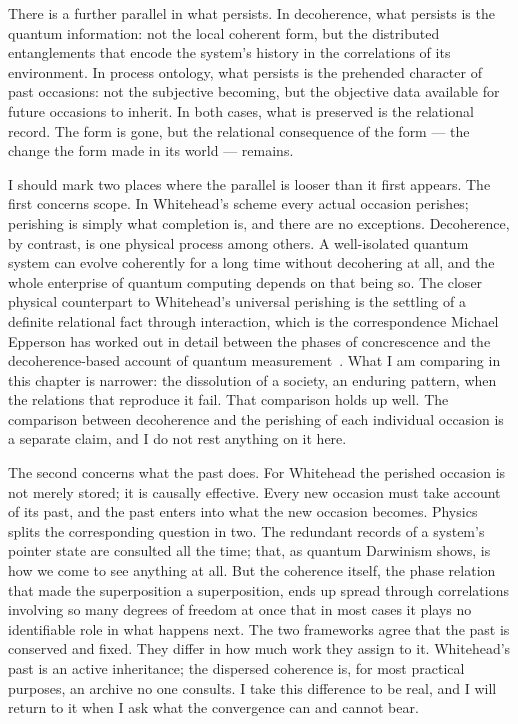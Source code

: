 There is a further parallel in what persists.
In decoherence, what persists is the quantum information: not the local coherent form, but the distributed entanglements that encode the system's history in the correlations of its environment.
In process ontology, what persists is the prehended character of past occasions: not the subjective becoming, but the objective data available for future occasions to inherit.
In both cases, what is preserved is the relational record.
The form is gone, but the relational consequence of the form --- the change the form made in its world --- remains.

I should mark two places where the parallel is looser than it first appears.
The first concerns scope.
In Whitehead's scheme every actual occasion perishes; perishing is simply what completion is, and there are no exceptions.
Decoherence, by contrast, is one physical process among others.
A well-isolated quantum system can evolve coherently for a long time without decohering at all, and the whole enterprise of quantum computing depends on that being so.
The closer physical counterpart to Whitehead's universal perishing is the settling of a definite relational fact through interaction, which is the correspondence Michael Epperson has worked out in detail between the phases of concrescence and the decoherence-based account of quantum measurement~\citep{Epperson2004}.
What I am comparing in this chapter is narrower: the dissolution of a society, an enduring pattern, when the relations that reproduce it fail.
That comparison holds up well.
The comparison between decoherence and the perishing of each individual occasion is a separate claim, and I do not rest anything on it here.

The second concerns what the past does.
For Whitehead the perished occasion is not merely stored; it is causally effective.
Every new occasion must take account of its past, and the past enters into what the new occasion becomes.
Physics splits the corresponding question in two.
The redundant records of a system's pointer state are consulted all the time; that, as quantum Darwinism shows, is how we come to see anything at all.
But the coherence itself, the phase relation that made the superposition a superposition, ends up spread through correlations involving so many degrees of freedom at once that in most cases it plays no identifiable role in what happens next.
The two frameworks agree that the past is conserved and fixed.
They differ in how much work they assign to it.
Whitehead's past is an active inheritance; the dispersed coherence is, for most practical purposes, an archive no one consults.
I take this difference to be real, and I will return to it when I ask what the convergence can and cannot bear.

